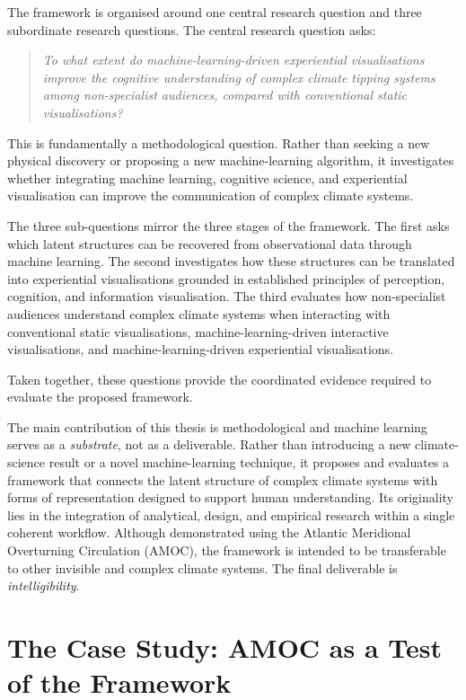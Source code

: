 The framework is organised around one central research question and three subordinate research questions. The central research question asks:

\begin{quote}
\emph{To what extent do machine-learning-driven experiential visualisations improve the cognitive understanding of complex climate tipping systems among non-specialist audiences, compared with conventional static visualisations?}
\end{quote}

This is fundamentally a methodological question. Rather than seeking a new physical discovery or proposing a new machine-learning algorithm, it investigates whether integrating machine learning, cognitive science, and experiential visualisation can improve the communication of complex climate systems.

The three sub-questions mirror the three stages of the framework. The first asks which latent structures can be recovered from observational data through machine learning. The second investigates how these structures can be translated into experiential visualisations grounded in established principles of perception, cognition, and information visualisation. The third evaluates how non-specialist audiences understand complex climate systems when interacting with conventional static visualisations, machine-learning-driven interactive visualisations, and machine-learning-driven experiential visualisations.

Taken together, these questions provide the coordinated evidence required to evaluate the proposed framework.

The main contribution of this thesis is methodological and machine learning serves as a \emph{substrate}, not as a deliverable. Rather than introducing a new climate-science result or a novel machine-learning technique, it proposes and evaluates a framework that connects the latent structure of complex climate systems with forms of representation designed to support human understanding. Its originality lies in the integration of analytical, design, and empirical research within a single coherent workflow. Although demonstrated using the Atlantic Meridional Overturning Circulation (AMOC), the framework is intended to be transferable to other invisible and complex climate systems. The final deliverable is \emph{intelligibility}.

\section{The Case Study: AMOC as a Test of the Framework}
\label{sec:case-study-amoc}

